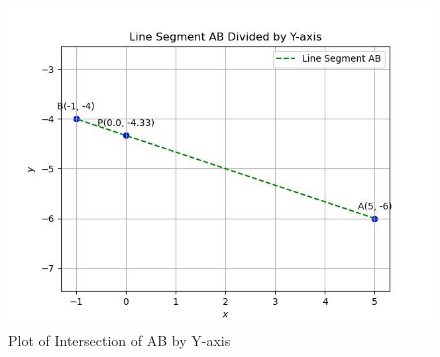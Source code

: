 \documentclass[journal]{IEEEtran}
\begin{document}
\begin{figure}
    \centering
    \includegraphics[width=0.7\columnwidth]{figs/plot_c.jpg}
    \caption*{Plot of Intersection of AB by Y-axis}
    \label{fig:fig}
\end{figure}
\end{document}
